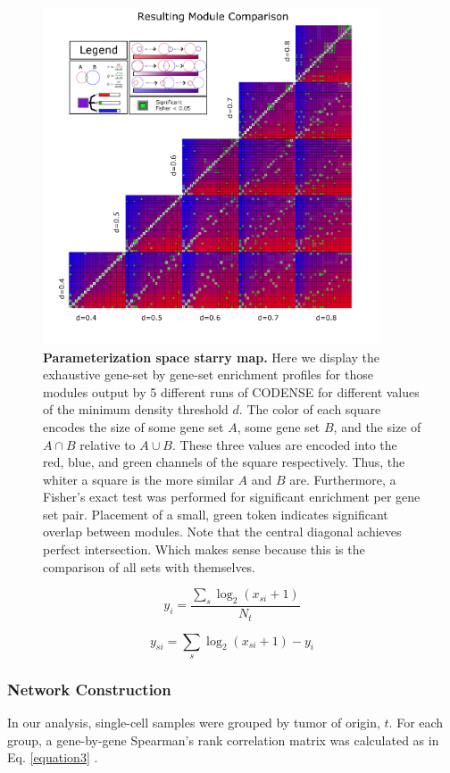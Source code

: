 \documentclass[10pt,letterpaper]{article}
\begin{document}
\begin{figure}[h]
\centering
\includegraphics[width=100mm]{Figures/moduleStaryNight2}
\caption{\textbf{Parameterization space starry map.} Here we display the exhaustive gene-set by gene-set enrichment profiles for those modules output by 5 different runs of CODENSE for different values of the minimum density threshold $d$. The color of each square encodes the size of some gene set $A$, some gene set $B$, and the size of $A\cap{}B$ relative to $A\cup{}B$. These three values are encoded into the red, blue, and green channels of the square respectively. Thus, the whiter a square is the more similar $A$ and $B$ are. Furthermore, a Fisher's exact test was performed for significant enrichment per gene set pair. Placement of a small, green token indicates significant overlap between modules. 
Note that the central diagonal achieves perfect intersection. Which makes sense because this is the comparison of all sets with themselves.}
\label{fig:starryNight1}
\end{figure}

\begin{equation}\label{equation1}
y_{i} = \frac{\sum_{s} \log_2(x_{si} + 1)} {N_t}
\end{equation}

\begin{equation}\label{equation2}
y_{si}=\sum_{s} \log_2(x_{si} + 1)-y_i
\end{equation}

\subsubsection{Network Construction}
In our analysis, single-cell samples were grouped by tumor of origin, $t$. For each group, a gene-by-gene Spearman’s rank correlation matrix was calculated as in Eq. \ref{equation3} .
\end{document}
